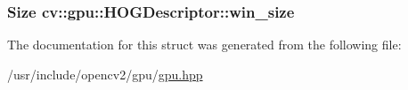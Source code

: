 \hypertarget{structcv_1_1gpu_1_1HOGDescriptor_a81c175ea3b25ddf619d5a693c6b011b0}{
\subsubsection[{win\-\_\-size}]{\setlength{\rightskip}{0pt plus 5cm}Size cv\-::gpu\-::\-H\-O\-G\-Descriptor\-::win\-\_\-size}}\label{structcv_1_1gpu_1_1HOGDescriptor_a81c175ea3b25ddf619d5a693c6b011b0}


The documentation for this struct was generated from the following file\-:\begin{DoxyCompactItemize}
\item 
/usr/include/opencv2/gpu/\hyperlink{gpu_2gpu_8hpp}{gpu.\-hpp}\end{DoxyCompactItemize}

